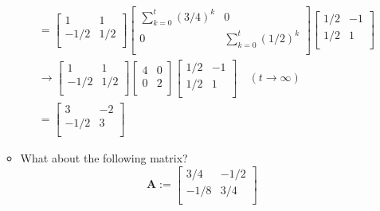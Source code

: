 \documentclass[12pt,a4paper]{article}
\begin{document}
\begin{itemize}
\begin{itemize}
\begin{align}
        & =
          \begin{bmatrix}
            1 & 1 \\
            -1/2 & 1/2 \\
          \end{bmatrix}
          \begin{bmatrix}
            \sum_{k=0}^{t}(3/4)^{k} & 0 \\
            0 & \sum_{k=0}^{t}(1/2)^{k} \\
          \end{bmatrix}
          \begin{bmatrix}
            1/2 & -1 \\
            1/2 & 1 \\
          \end{bmatrix}
          \nonumber \\
        & \to
          \begin{bmatrix}
            1 & 1 \\
            -1/2 & 1/2 \\
          \end{bmatrix}
          \begin{bmatrix}
            4 & 0 \\
            0 & 2 \\
          \end{bmatrix}
          \begin{bmatrix}
            1/2 & -1 \\
            1/2 & 1 \\
          \end{bmatrix}
          \quad (t \to \infty)
          \nonumber \\
        & = 
          \begin{bmatrix}
            3 & -2 \\
            -1/2 & 3 \\
          \end{bmatrix}
          \nonumber
    \end{align}
    
  \item What about the following matrix?
    \begin{equation}\nonumber%
      \bm{A} :=
      \begin{bmatrix}
        3/4 & -1/2 \\
        -1/8 & 3/4 \\
      \end{bmatrix}
    \end{equation}
  \end{itemize}
  \clearpage


\end{itemize}
\end{document}
